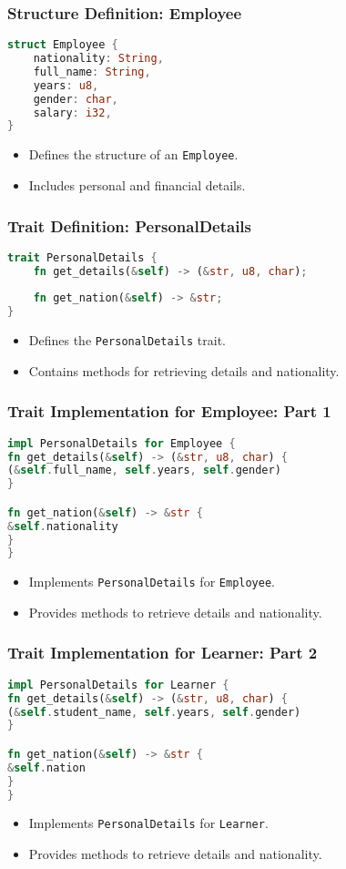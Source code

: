 \documentclass[aspectratio=169, table]{beamer}
\begin{document}
\begin{frame}[fragile]
\frametitle{Structure Definition: Employee}
\begin{lstlisting}[language=Rust]
struct Employee {
	nationality: String,
	full_name: String,
	years: u8,
	gender: char,
	salary: i32,
}
\end{lstlisting}
\begin{itemize}
\item Defines the structure of an \texttt{Employee}.
\item Includes personal and financial details.
\end{itemize}
\end{frame}

\begin{frame}[fragile]
\frametitle{Trait Definition: PersonalDetails}
\begin{lstlisting}[language=Rust]
trait PersonalDetails {
	fn get_details(&self) -> (&str, u8, char);
	
	fn get_nation(&self) -> &str;
}
\end{lstlisting}
\begin{itemize}
\item Defines the \texttt{PersonalDetails} trait.
\item Contains methods for retrieving details and nationality.
\end{itemize}
\end{frame}

\begin{frame}[fragile]
\frametitle{Trait Implementation for Employee: Part 1}
\begin{lstlisting}[language=Rust]
impl PersonalDetails for Employee {
fn get_details(&self) -> (&str, u8, char) {
(&self.full_name, self.years, self.gender)
}

fn get_nation(&self) -> &str {
&self.nationality
}
}
\end{lstlisting}
\begin{itemize}
\item Implements \texttt{PersonalDetails} for \texttt{Employee}.
\item Provides methods to retrieve details and nationality.
\end{itemize}
\end{frame}

\begin{frame}[fragile]
\frametitle{Trait Implementation for Learner: Part 2}
\begin{lstlisting}[language=Rust]
impl PersonalDetails for Learner {
fn get_details(&self) -> (&str, u8, char) {
(&self.student_name, self.years, self.gender)
}

fn get_nation(&self) -> &str {
&self.nation
}
}
\end{lstlisting}
\begin{itemize}
\item Implements \texttt{PersonalDetails} for \texttt{Learner}.
\item Provides methods to retrieve details and nationality.
\end{itemize}
\end{frame}
\end{document}
